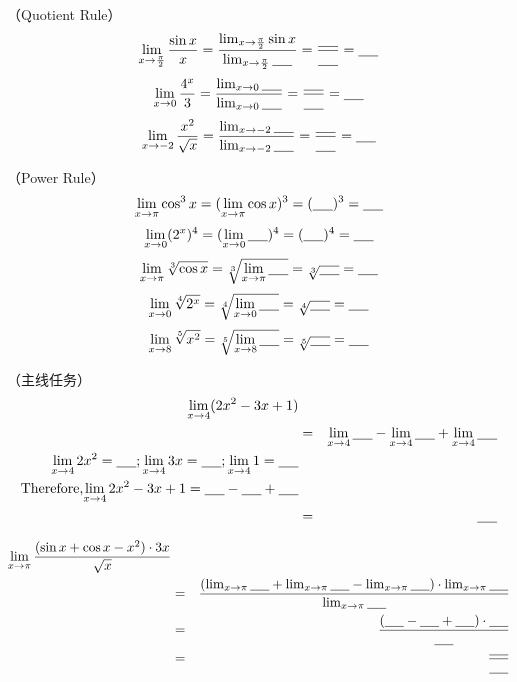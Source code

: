 \documentclass[UTF8]{ctexart}
\begin{document}
（Quotient Rule）
\[ {\lim_{x \to \frac{\pi}{2}} \frac{\sin{x}}{x}} = \frac{{\lim_{x \to \frac{\pi}{2}} \sin{x}}}{{\lim_{x \to \frac{\pi}{2}} \underline{\hbox to 5mm{}}}} =  \frac{\underline{\hbox to 5mm{}}}{\underline{\hbox to 5mm{}}} =  \underline{\hbox to 5mm{}}\]
\[ {\lim_{x \to 0} \frac{4^x}{3}} = \frac{{\lim_{x \to 0} \underline{\hbox to 5mm{}}}}{{\lim_{x \to 0} \underline{\hbox to 5mm{}}}} =  \frac{\underline{\hbox to 5mm{}}}{\underline{\hbox to 5mm{}}} =  \underline{\hbox to 5mm{}}\]
\[ {\lim_{x \to -2} \frac{x^2}{\sqrt{x}}} = \frac{{\lim_{x \to -2} \underline{\hbox to 5mm{}}}}{{\lim_{x \to -2} \underline{\hbox to 5mm{}}}} =  \frac{\underline{\hbox to 5mm{}}}{\underline{\hbox to 5mm{}}} =  \underline{\hbox to 5mm{}}\]

（Power Rule）
\[ {\lim_{x \to \pi} \cos^3{x}} = ({\lim_{x \to \pi} \cos{x}})^3 =  (\underline{\hbox to 5mm{}})^3 =  \underline{\hbox to 5mm{}}\]
\[ {\lim_{x \to 0} (2^x)^4} = ({\lim_{x \to 0} \underline{\hbox to 5mm{}}})^4 =  (\underline{\hbox to 5mm{}})^4 =  \underline{\hbox to 5mm{}}\]
\[ {\lim_{x \to \pi} \sqrt[3]{\cos{x}}} = \sqrt[3]{{\lim_{x \to \pi} \underline{\hbox to 5mm{}}}} =  \sqrt[3]{\underline{\hbox to 5mm{}}} =  \underline{\hbox to 5mm{}}\]
\[ {\lim_{x \to 0} \sqrt[4]{2^x}} = \sqrt[4]{{\lim_{x \to 0} \underline{\hbox to 5mm{}}}} =  \sqrt[4]{\underline{\hbox to 5mm{}}} =  \underline{\hbox to 5mm{}}\]
\[ {\lim_{x \to 8} \sqrt[5]{x^2}} = \sqrt[5]{\lim_{x \to 8} \underline{\hbox to 5mm{}}} =  \sqrt[5]{\underline{\hbox to 5mm{}}} =  \underline{\hbox to 5mm{}}\]

（主线任务）
\begin{eqnarray*}
{\lim_{x \to 4} (2x^2 - 3x + 1)} \\
& = & {\lim_{x \to 4} \underline{\hbox to 5mm{}}} - {\lim_{x \to 4} \underline{\hbox to 5mm{}}} + {\lim_{x \to 4} \underline{\hbox to 5mm{}}}\\
{\lim_{x \to 4} 2x^2} = \underline{\hbox to 5mm{}} ; {\lim_{x \to 4} 3x} = \underline{\hbox to 5mm{}}; {\lim_{x \to 4} 1} = \underline{\hbox to 5mm{}}\\
\text{Therefore,} {\lim_{x \to 4} 2x^2 - 3x + 1}  = \underline{\hbox to 5mm{}} - \underline{\hbox to 5mm{}} + \underline{\hbox to 5mm{}}\\
& = & \underline{\hbox to 5mm{}}
\end{eqnarray*}

\begin{eqnarray*}
{\lim_{x \to \pi} \frac{(\sin{x} + \cos{x} - x^2) \cdot 3x}{\sqrt{x}}} \\
& = & \frac{({\lim_{x \to \pi} \underline{\hbox to 5mm{}}} + {\lim_{x \to \pi}\underline{\hbox to 5mm{}}} - {\lim_{x \to \pi} \underline{\hbox to 5mm{}}} )\cdot {\lim_{x \to \pi} \underline{\hbox to 5mm{}}}}{{\lim_{x \to \pi} \underline{\hbox to 5mm{}}}}\\
& = & \frac{(\underline{\hbox to 5mm{}}-\underline{\hbox to 5mm{}}+\underline{\hbox to 5mm{}}) \cdot \underline{\hbox to 5mm{}}}{\underline{\hbox to 5mm{}}}\\
& = & \frac{\underline{\hbox to 5mm{}}}{\underline{\hbox to 5mm{}}}
\end{eqnarray*}
\end{document}
